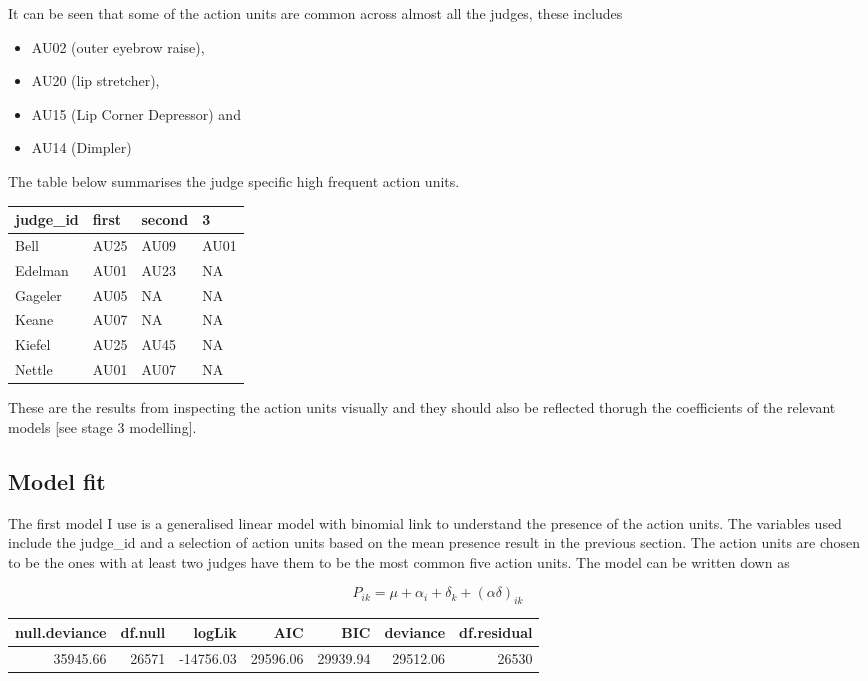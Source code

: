 \documentclass{monashthesis}
\begin{document}
It can be seen that some of the action units are common across almost all the judges, these includes

\begin{itemize}
\tightlist
\item
  AU02 (outer eyebrow raise),
\item
  AU20 (lip stretcher),
\item
  AU15 (Lip Corner Depressor) and
\item
  AU14 (Dimpler)
\end{itemize}

The table below summarises the judge specific high frequent action units.

\begin{tabular}{l|l|l|l}
\hline
judge\_id & first & second & 3\\
\hline
Bell & AU25 & AU09 & AU01\\
\hline
Edelman & AU01 & AU23 & NA\\
\hline
Gageler & AU05 & NA & NA\\
\hline
Keane & AU07 & NA & NA\\
\hline
Kiefel & AU25 & AU45 & NA\\
\hline
Nettle & AU01 & AU07 & NA\\
\hline
\end{tabular}

These are the results from inspecting the action units visually and they should also be reflected thorugh the coefficients of the relevant models {[}see stage 3 modelling{]}.

\hypertarget{model-fit}{%
\subsection{Model fit}\label{model-fit}}

The first model I use is a generalised linear model with binomial link to understand the presence of the action units. The variables used include the judge\_id and a selection of action units based on the mean presence result in the previous section. The action units are chosen to be the ones with at least two judges have them to be the most common five action units. The model can be written down as

\[P_{ik} = \mu + \alpha_i + \delta_k + (\alpha\delta)_{ik}\]

\begin{tabular}{r|r|r|r|r|r|r}
\hline
null.deviance & df.null & logLik & AIC & BIC & deviance & df.residual\\
\hline
35945.66 & 26571 & -14756.03 & 29596.06 & 29939.94 & 29512.06 & 26530\\
\hline
\end{tabular}
\end{document}

